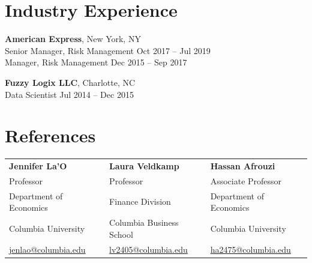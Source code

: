 \documentclass[11pt]{article}
\begin{document}

\section*{Industry Experience}

\textbf{American Express}, New York, NY \\
Senior Manager, Risk Management \hfill Oct 2017 -- Jul 2019 \\
Manager, Risk Management \hfill Dec 2015 -- Sep 2017

\textbf{Fuzzy Logix LLC}, Charlotte, NC \\
Data Scientist \hfill Jul 2014 -- Dec 2015

\section*{References}

\begin{tabularx}{\textwidth}{X X X}
\textbf{Jennifer La’O} & \textbf{Laura Veldkamp} & \textbf{Hassan Afrouzi} \\
Professor & Professor & Associate Professor\\
Department of Economics & Finance Division & Department of Economics\\
Columbia University & Columbia Business School & Columbia University \\
\href{mailto:jenlao@columbia.edu}{jenlao@columbia.edu} &
\href{mailto:lv2405@columbia.edu}{lv2405@columbia.edu} &
\href{mailto:ha2475@columbia.edu}{ha2475@columbia.edu}
\end{tabularx}
\end{document}
